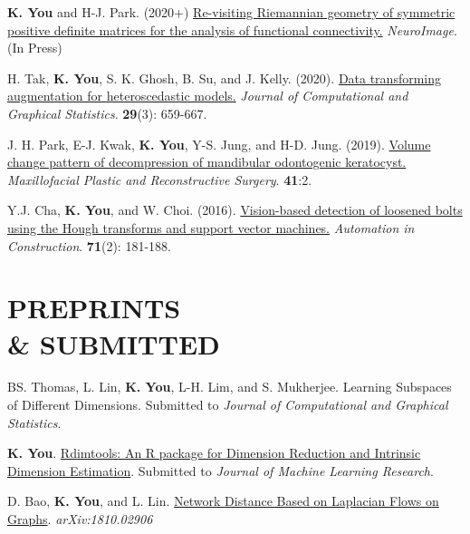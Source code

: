 \documentclass[margin, 10pt]{res} %
\begin{document}
\begin{resume}
\begin{enumerate}[label={[\arabic*]}]
	\item {\bf K. You} and H-J. Park. (2020+) \href{https://doi.org/10.1016/j.neuroimage.2020.117464}{Re-visiting Riemannian geometry of symmetric positive definite matrices for the analysis of functional connectivity.} \textit{NeuroImage}. (In Press)
	\item H. Tak, {\bf K. You}, S. K. Ghosh, B. Su, and J. Kelly. (2020). \href{https://doi.org/10.1080/10618600.2019.1704295}{Data transforming augmentation for heteroscedastic models.} {\it Journal of Computational and Graphical Statistics}. {\bf 29}(3): 659-667. 
	\item J. H. Park, E-J. Kwak, {\bf K. You}, Y-S. Jung, and H-D. Jung. (2019).
	\href{https://rdcu.be/bfKR8}{Volume change pattern of decompression of mandibular odontogenic keratocyst.} {\it Maxillofacial Plastic and Reconstructive Surgery}. {\bf 41}:2.	
	\item Y.J. Cha, {\bf K. You}, and W. Choi. (2016). \href{https://doi.org/10.1016/j.autcon.2016.06.008}{Vision-based detection of loosened bolts using the Hough transforms and support vector machines.} {\it Automation in Construction}. {\bf 71}(2): 181-188.
\end{enumerate}
\vspace{.2cm}


\section{\sf PREPRINTS \\ \& SUBMITTED} 

\begin{enumerate}[label={[\roman*]}] 
	\item BS. Thomas, L. Lin, \textbf{K. You}, L-H. Lim, and S. Mukherjee. Learning Subspaces of Different Dimensions. Submitted to \textit{Journal of Computational and Graphical Statistics}.
	\item \textbf{K. You}. \href{https://arxiv.org/abs/2005.11107}{Rdimtools: An R package for Dimension Reduction and Intrinsic Dimension Estimation}. Submitted to \textit{Journal of Machine Learning Research}.
	\item D. Bao, \textbf{K. You}, and L. Lin. \href{https://arxiv.org/abs/1810.02906}{Network Distance Based on Laplacian Flows on Graphs}. {\it arXiv:1810.02906}
\end{enumerate}
\vspace{.2cm}





\end{resume}
\end{document}
